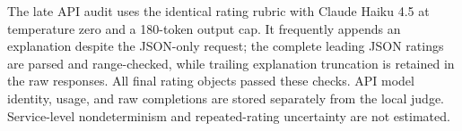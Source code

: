 The late API audit uses the identical rating rubric with Claude Haiku 4.5 at temperature zero and a 180-token output cap. It frequently appends an explanation despite the JSON-only request; the complete leading JSON ratings are parsed and range-checked, while trailing explanation truncation is retained in the raw responses. All final rating objects passed these checks. API model identity, usage, and raw completions are stored separately from the local judge. Service-level nondeterminism and repeated-rating uncertainty are not estimated.

